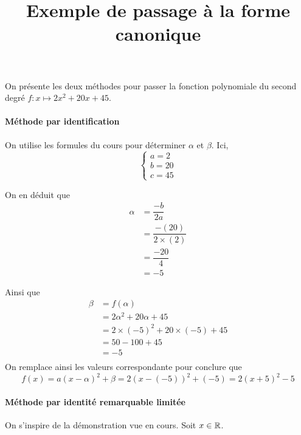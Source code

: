 \documentclass{article}
\title{Exemple de passage à la forme canonique}
\author{}
\date{}
\begin{document}
\maketitle

\begin{tcolorbox}
On présente les deux méthodes pour passer la fonction polynomiale du second degré $f \colon x \mapsto 2x^2 + 20x + 45$.
\end{tcolorbox}
\paragraph*{Méthode par identification}
On utilise les formules du cours pour déterminer $\alpha$ et $\beta$. Ici, 
\begin{equation*}
\begin{cases}
a = 2\\
b = 20\\
c = 45
\end{cases}
\end{equation*}

On en déduit que 
\begin{equation*}
\begin{aligned}
\alpha &= \dfrac{-b}{2a}\\
&= \dfrac{-(20)}{2 \times (2)}\\
&= \dfrac{-20}{4}\\
&= -5
\end{aligned}  
\end{equation*}

Ainsi que
\begin{equation*}
\begin{aligned}
\beta &= f(\alpha)\\
&= 2\alpha^2 + 20\alpha + 45\\
&= 2 \times (-5)^2 + 20 \times (-5) + 45\\
&= 50 - 100 + 45\\
&= -5\\
\end{aligned}
\end{equation*}
On remplace ainsi les valeurs correspondante pour conclure que
\begin{equation*}
f(x) = a(x - \alpha)^2 + \beta = 2(x - (-5))^2 + (-5) = 2(x+5)^2 - 5
\end{equation*}
\paragraph*{Méthode par identité remarquable \og limitée \fg}
On s'inspire de la démonstration vue en cours. Soit $x \in \mathbb{R}$.
\end{document}
